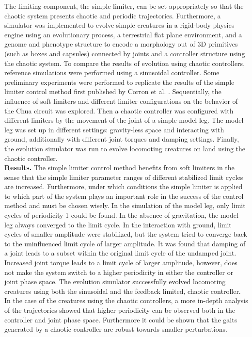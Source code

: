 \documentclass[11pt, a4paper, oneside]{Thesis} %
\begin{document}
{%
The limiting component, the simple limiter, can be set appropriately so that the chaotic system presents chaotic and periodic trajectories. %
%
Furthermore, a simulator was implemented to evolve simple creatures in a rigid-body physics engine using an evolutionary process, a terrestrial flat plane environment, and a genome and phenotype structure to encode a morphology out of 3D primitives (such as boxes and capsules) connected by joints and a controller structure using the chaotic system. %
%
To compare the results of evolution using chaotic controllers, reference simulations were performed using a sinusoidal controller. %
%
Some preliminary experiments were performed to replicate the results of the simple limiter control method first published by Corron et al. \cite{bib:Corron2000}. %
%
Sequentially, the influence of soft limiters and different limiter configurations on the behavior of the Chua circuit was explored. %
%
Then a chaotic controller was configured with different limiters by the movement of the joint of a simple model leg. %
%
The model leg was set up in different settings: gravity-less space and interacting with ground, additionally with different joint torques and damping settings. %
%
Finally, the evolution simulator was run to evolve locomoting creatures on land using the chaotic controller. \\
%
%
\textbf{Results.} The simple limiter control method benefits from soft limiters in the sense that the simple limiter parameter ranges of different stabilized limit cycles are increased. %
%
Furthermore, under which conditions the simple limiter is applied to which part of the system plays an important role in the success of the control method and must be chosen wisely. %
%
In the simulation of the model leg, only limit cycles of periodicity 1 could be found. In the absence of gravitation, the model leg always converged to the limit cycle. %
%
In the interaction with ground, limit cycles of smaller amplitude were stabilized, but the system tried to converge back to the uninfluenced limit cycle of larger amplitude. %
%
It was found that damping of a joint leads to a subset within the original limit cycle of the undamped joint. %
%
Increased joint torque leads to a limit cycle of larger amplitude, however, does not make the system switch to a higher periodicity in either the controller or joint phase space. %
%
The evolution simulator successfully evolved locomoting creatures using both the sinusoidal and the feedback limited, chaotic controller. %
%
In the case of the creatures using the chaotic controllers, a more in-depth analysis of the trajectories showed that higher periodicity can be observed both in the controller and joint phase space. %
%
Furthermore it could be shown that the gaits generated by a chaotic controller are robust towards smaller perturbations. %

}
\end{document}
